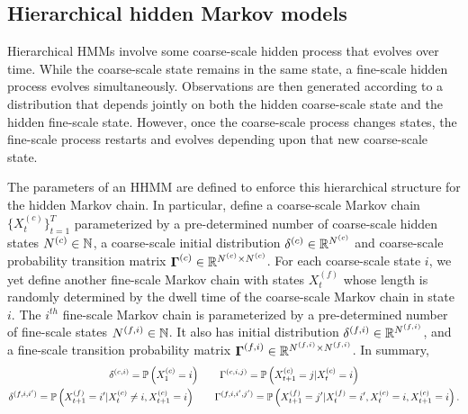 
\subsection{Hierarchical hidden Markov models}

Hierarchical HMMs involve some coarse-scale hidden process that evolves over time. While the coarse-scale state remains in the same state, a fine-scale hidden process evolves simultaneously. Observations are then generated according to a distribution that depends jointly on both the hidden coarse-scale state and the hidden fine-scale state. However, once the coarse-scale process changes states, the fine-scale process restarts and evolves depending upon that new coarse-scale state.

The parameters of an HHMM are defined to enforce this hierarchical structure for the hidden Markov chain. In particular, define a coarse-scale Markov chain $\{X^{(c)}_t\}_{t=1}^T$ parameterized by a pre-determined number of coarse-scale hidden states $N^{(c)} \in \mathbb{N}$, a coarse-scale initial distribution $\delta^{(c)} \in \mathbb{R}^{N^{(c)}}$ and coarse-scale probability transition matrix $\boldsymbol{\Gamma}^{(c)} \in \mathbb{R}^{{N^{(c)}} \times {N^{(c)}}}$. For each coarse-scale state $i$, we yet define another fine-scale Markov chain with states $X^{(f)}_t$ whose length is randomly determined by the dwell time of the coarse-scale Markov chain in state $i$. The $i^{th}$ fine-scale Markov chain is parameterized by a pre-determined number of fine-scale states $N^{(f,i)} \in \mathbb{N}$. It also has initial distribution $\delta^{(f,i)} \in \mathbb{R}^{N^{(f,i)}}$, and a fine-scale transition probability matrix $\boldsymbol{\Gamma}^{(f,i)} \in \mathbb{R}^{N^{(f,i)} \times N^{(f,i)}}$. In summary, 
%
\begin{gather}
    \delta^{(c,i)} = \mathbb{P}\left( X_1^{(c)} = i \right) \qquad 
    \Gamma^{(c,i,j)} = \mathbb{P}\left( X_{t+1}^{(c)} = j | X_{t}^{(c)} = i \right) \\
    \delta^{(f,i,i')} = \mathbb{P}\left( X_{t+1}^{(f)} = i' | X_{t}^{(c)} \neq i, X_{t+1}^{(c)} = i \right) \qquad 
    \Gamma^{(f,i,i',j')} = \mathbb{P}\left( X_{t+1}^{(f)} = j' | X_{t}^{(f)} = i', X_{t}^{(c)} = i, X_{t+1}^{(c)} = i \right).
\end{gather}

